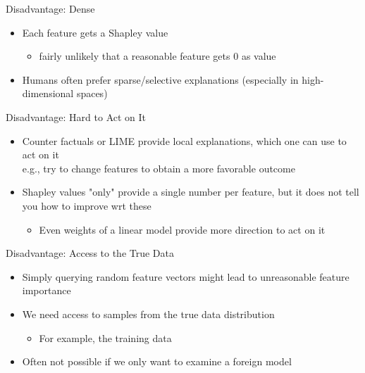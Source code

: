 \documentclass[aspectratio=169]{../latex_main/tntbeamer}  %
\begin{document}
\begin{frame}{Disadvantage: Dense}
    
    \begin{itemize}
        \item Each feature gets a Shapley value
        \begin{itemize}
            \item fairly unlikely that a reasonable feature gets $0$ as value
        \end{itemize}
        \item Humans often prefer sparse/selective explanations (especially in high-dimensional spaces)
    \end{itemize}
    
\end{frame}

\begin{frame}{Disadvantage: Hard to Act on It}
    
    \begin{itemize}
        \item Counter factuals or LIME provide local explanations, which one can use to act on it\\ e.g., try to change features to obtain a more favorable outcome
        \item Shapley values "only" provide a single number per feature, but it does not tell you how to improve wrt these
        \begin{itemize}
            \item Even weights of a linear model provide more direction to act on it
        \end{itemize}
        
    \end{itemize}
    
\end{frame}

\begin{frame}{Disadvantage: Access to the True Data}
    
    \begin{itemize}
        \item Simply querying random feature vectors might lead to unreasonable feature importance
        \item We need access to samples from the true data distribution
        \begin{itemize}
            \item For example, the training data
        \end{itemize}
        \item Often not possible if we only want to examine a foreign model
    \end{itemize}
    
\end{frame}
\end{document}
